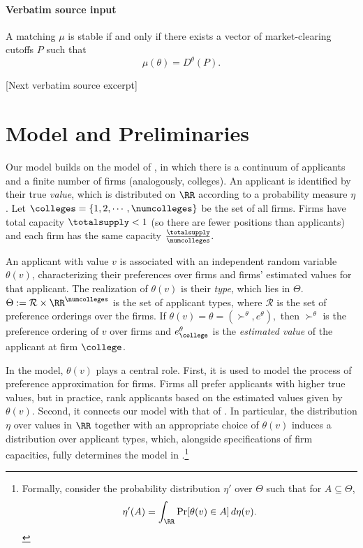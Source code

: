 \documentclass[10pt]{article}
\begin{document}
\paragraph{Verbatim source input}
\begin{ReviewVerbatim}
\begin{lemma}\label{lem:supply-demand}
    A matching $\mu$ is stable if and only if there exists a vector of market-clearing cutoffs $P$ such that
    \begin{equation}
        \mu(\theta) = D^\theta(P).
    \end{equation}
\end{lemma}

[Next verbatim source excerpt]

\section{Model and Preliminaries}
Our model builds on the model of \cite{azevedo2016supply}, in which there is a continuum of applicants and a finite number of firms (analogously, colleges). An applicant is identified by their true \textit{value}, which is distributed on $\RR$ according to a probability measure $\eta$. Let $\colleges = \{1, 2, \cdots, \numcolleges\}$ be the set of all firms. Firms have total capacity $\totalsupply < 1$ (so there are fewer positions than applicants) and each firm has the same capacity $\frac{\totalsupply}{\numcolleges}.$

An applicant with value $v$ is associated with an independent random variable $\theta(v)$, characterizing their preferences over firms and firms' estimated values for that applicant. The realization of $\theta(v)$ is their \textit{type}, which lies in $\Theta$. $\Theta := \mathcal{R} \times \RR^\numcolleges$ is the set of applicant types, where $\mathcal{R}$ is the set of preference orderings over the firms. If $\theta(v) = \theta = (\succ^\theta, e^\theta),$ then $\succ^\theta$ is the preference ordering of $v$ over firms and $e^\theta_\college$ is the \textit{estimated value} of the applicant at firm $\college$.

In the model, $\theta(v)$ plays a central role. First, it is used to model the process of preference approximation for firms. Firms all prefer applicants with higher true values, but in practice, rank applicants based on the estimated values given by $\theta(v)$. Second, it connects our model with that of \cite{azevedo2016supply}. In particular, the distribution $\eta$ over values in $\RR$ together with an appropriate choice of $\theta(v)$ induces a distribution over applicant types, which, alongside specifications of firm capacities, fully determines the model in \cite{azevedo2016supply}.\footnote{Formally, consider the probability distribution $\eta'$ over $\Theta$ such that for $A\subseteq \Theta$,
\begin{equation}
    \eta'(A) = \int_\RR \Pr[\theta(v)\in A]\,d\eta(v).
\end{equation}}


\end{ReviewVerbatim}
\end{document}
